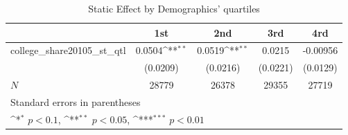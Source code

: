 \begin{table}[htbp]\centering
\def\sym#1{\ifmmode^{#1}\else\(^{#1}\)\fi}
\caption{Static Effect by Demographics' quartiles}
\begin{tabular}{l*{4}{c}}
\hline\hline
            &\multicolumn{1}{c}{1st}&\multicolumn{1}{c}{2nd}&\multicolumn{1}{c}{3rd}&\multicolumn{1}{c}{4rd}\\
\hline
college\_share20105\_st\_qtl&      0.0504\sym{**} &      0.0519\sym{**} &      0.0215         &    -0.00956         \\
            &    (0.0209)         &    (0.0216)         &    (0.0221)         &    (0.0129)         \\
\hline
\(N\)       &       28779         &       26378         &       29355         &       27719         \\
\hline\hline
\multicolumn{5}{l}{\footnotesize Standard errors in parentheses}\\
\multicolumn{5}{l}{\footnotesize \sym{*} \(p<0.1\), \sym{**} \(p<0.05\), \sym{***} \(p<0.01\)}\\
\end{tabular}
\end{table}
